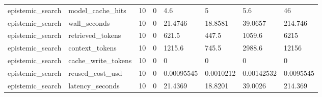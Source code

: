 \begin{tabular}{llllllll}
epistemic\_search & model\_cache\_hits & 10 & 0 & 4.6 & 5 & 5.6 & 46 \\
epistemic\_search & wall\_seconds & 10 & 0 & 21.4746 & 18.8581 & 39.0657 & 214.746 \\
epistemic\_search & retrieved\_tokens & 10 & 0 & 621.5 & 447.5 & 1059.6 & 6215 \\
epistemic\_search & context\_tokens & 10 & 0 & 1215.6 & 745.5 & 2988.6 & 12156 \\
epistemic\_search & cache\_write\_tokens & 10 & 0 & 0 & 0 & 0 & 0 \\
epistemic\_search & reused\_cost\_usd & 10 & 0 & 0.00095545 & 0.0010212 & 0.00142532 & 0.0095545 \\
epistemic\_search & latency\_seconds & 10 & 0 & 21.4369 & 18.8201 & 39.0026 & 214.369 \\
\hline
\end{tabular}
